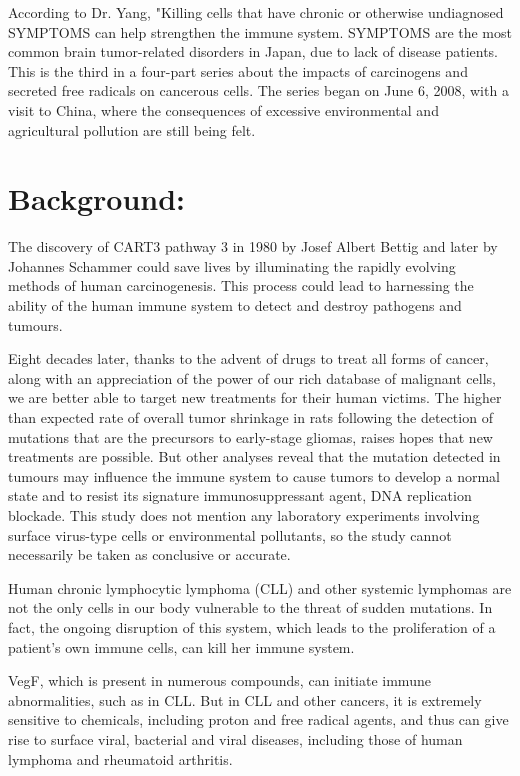 \documentclass{article}
\begin{document}
According to Dr. Yang, "Killing cells that have chronic or otherwise undiagnosed SYMPTOMS can help strengthen the immune system. SYMPTOMS are the most common brain tumor-related disorders in Japan, due to lack of disease patients. This is the third in a four-part series about the impacts of carcinogens and secreted free radicals on cancerous cells. The series began on June 6, 2008, with a visit to China, where the consequences of excessive environmental and agricultural pollution are still being felt.



\section{Background:}


The discovery of CART3 pathway 3 in 1980 by Josef Albert Bettig and later by Johannes Schammer could save lives by illuminating the rapidly evolving methods of human carcinogenesis. This process could lead to harnessing the ability of the human immune system to detect and destroy pathogens and tumours.

Eight decades later, thanks to the advent of drugs to treat all forms of cancer, along with an appreciation of the power of our rich database of malignant cells, we are better able to target new treatments for their human victims. The higher than expected rate of overall tumor shrinkage in rats following the detection of mutations that are the precursors to early-stage gliomas, raises hopes that new treatments are possible. But other analyses reveal that the mutation detected in tumours may influence the immune system to cause tumors to develop a normal state and to resist its signature immunosuppressant agent, DNA replication blockade. This study does not mention any laboratory experiments involving surface virus-type cells or environmental pollutants, so the study cannot necessarily be taken as conclusive or accurate.

Human chronic lymphocytic lymphoma (CLL) and other systemic lymphomas are not the only cells in our body vulnerable to the threat of sudden mutations. In fact, the ongoing disruption of this system, which leads to the proliferation of a patient’s own immune cells, can kill her immune system.

VegF, which is present in numerous compounds, can initiate immune abnormalities, such as in CLL. But in CLL and other cancers, it is extremely sensitive to chemicals, including proton and free radical agents, and thus can give rise to surface viral, bacterial and viral diseases, including those of human lymphoma and rheumatoid arthritis.
\end{document}
